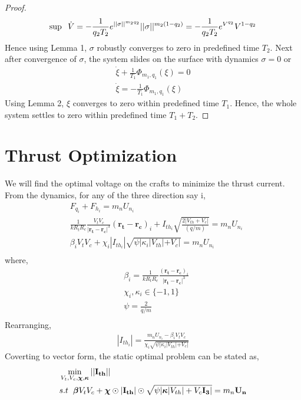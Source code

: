 \documentclass[]{article}
\theoremstyle{remark}
\theoremstyle{definition}
\begin{document}
\begin{proof}
\begin{align}
		\sup \hspace{2mm} \dot V = -\frac{1}{q_2T_2}e^{||\sigma||^{m_2q_2}}||\sigma||^{m_2(1-q_2)}  = -\frac{1}{q_2T_2}e^{V^{q_2}}V^{1-q_2}
	\end{align}
Hence using Lemma 1, $\sigma$ robustly converges to zero in predefined time $T_2$. \newline
Next after convergence of $\sigma$, the system slides on the surface with dynamics $\sigma =0$ or 
\begin{align}
\dot{\xi} + \frac{1}{T_1}\Phi_{m_1,q_1}(\xi) = 0 \\
\dot{\xi}  = -\frac{1}{T_1}\Phi_{m_1,q_1}(\xi)
\end{align}
Using Lemma 2, $ \xi $ converges to zero within predefined time $T_1$. \newline
Hence, the whole system settles to zero within predefined time $ T_1+T_2 $. 
\end{proof}
\section{Thrust Optimization}
We will find the optimal voltage on the crafts to minimize the thrust current.
From the dynamics, for any of the three direction  say i,  
\begin{align}
	&F_{q_i} + F_{h_i} = m_nU_{n_i} \\
	&\frac{1}{kR_t R_c}\frac{V_t V_c}{| \mathbf{r_t-r_c}|^3}(\mathbf{r_t-r_c})_i + I_{{th}_i}\sqrt{\frac{2|V_{th}+V_c|}{(q/m)}}  =  m_nU_{n_i} \\
	&\beta_i V_tV_c + \chi_i |I_{{th}_i}|\sqrt{\psi |\kappa_i|V_{th}|+V_c|} = m_nU_{n_i} \\
\end{align}
where,
\begin{align}
	&\beta_i = \frac{1}{kR_t R_c}\frac{(\mathbf{r_t-r_c})_i}{| \mathbf{r_t-r_c}|^3} \\
	&\chi_i, \kappa_i \in \{-1,1\} \\
	&\psi = \frac{2}{q/m} \\
\end{align}
Rearranging,
\begin{align}
	|I_{{th}_i}| = \frac{m_nU_{n_i}-\beta_i V_tV_c}{\chi_i\sqrt{\psi |\kappa_i|V_{th}|+V_c|}}
\end{align}
Coverting to vector form, the static optimal problem can be stated as,
\begin{align}
&\min_{V_t,V_c,\boldsymbol{\chi},\boldsymbol{\kappa}} ||\mathbf{I_{{th}}}|| \\
&s.t \hspace{2mm}  \boldsymbol{\beta}V_tV_c + \boldsymbol{\chi}\odot|\mathbf{I_{{th}}}|\odot\sqrt{\psi |\boldsymbol{\kappa}|V_{th}|+V_c\mathbf{I_{3}}|} = m_n\mathbf{U_{n}}	
\end{align}
\end{document}
